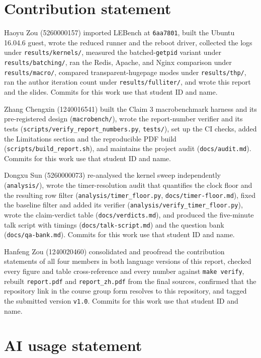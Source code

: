 \documentclass[11pt]{article}
\begin{document}
\section*{Contribution statement}

Haoyu Zou (5260000157) imported LEBench at \texttt{6aa7801}, built the Ubuntu 16.04.6 guest, wrote the reduced runner and the reboot driver, collected the logs under \texttt{results/kernels/}, measured the batched-\texttt{getpid} variant under \texttt{results/batching/}, ran the Redis, Apache, and Nginx comparison under \texttt{results/macro/}, compared transparent-hugepage modes under \texttt{results/thp/}, ran the author iteration count under \texttt{results/fulliter/}, and wrote this report and the slides. Commits for this work use that student ID and name.

Zhang Chengxin (1240016541) built the Claim 3 macrobenchmark harness and its pre-registered design (\texttt{macrobench/}), wrote the report-number verifier and its tests (\texttt{scripts/verify\_report\_numbers.py}, \texttt{tests/}), set up the CI checks, added the Limitations section and the reproducible PDF build (\texttt{scripts/build\_report.sh}), and maintains the project audit (\texttt{docs/audit.md}). Commits for this work use that student ID and name.

Dongxu Sun (5260000073) re-analysed the kernel sweep independently (\texttt{analysis/}), wrote the timer-resolution audit that quantifies the clock floor and the resulting row filter (\texttt{analysis/timer\_floor.py}, \texttt{docs/timer-floor.md}), fixed the baseline filter and added its verifier (\texttt{analysis/verify\_timer\_floor.py}), wrote the claim-verdict table (\texttt{docs/verdicts.md}), and produced the five-minute talk script with timings (\texttt{docs/talk-script.md}) and the question bank (\texttt{docs/qa-bank.md}). Commits for this work use that student ID and name.

Hanfeng Zou (1240020460) consolidated and proofread the contribution statements of all four members in both language versions of this report, checked every figure and table cross-reference and every number against \texttt{make verify}, rebuilt \texttt{report.pdf} and \texttt{report\_zh.pdf} from the final sources, confirmed that the repository link in the course group form resolves to this repository, and tagged the submitted version \texttt{v1.0}. Commits for this work use that student ID and name.

\section*{AI usage statement}
\end{document}
